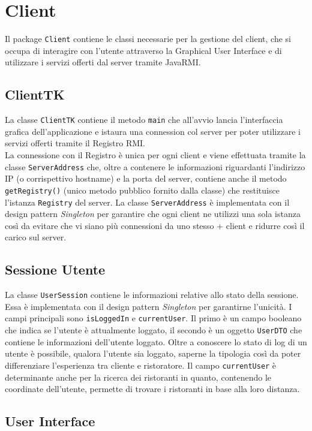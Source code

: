 \section{Client}
Il package \texttt{Client} contiene le classi necessarie per
la gestione del client, che si occupa di interagire con l'utente 
attraverso la Graphical User Interface e di utilizzare i 
servizi offerti dal server tramite JavaRMI.

\subsection{ClientTK}
La classe \texttt{ClientTK} contiene il metodo \texttt{main}
che all'avvio lancia l'interfaccia grafica dell'applicazione e 
istaura una connession col server per poter utilizzare i servizi 
offerti tramite il Registro RMI.\\
La connessione con il Registro è unica per ogni client e 
viene effettuata tramite la classe \texttt{ServerAddress} che, 
oltre a contenere le informazioni riguardanti l'indirizzo IP (o 
corrispettivo hostname) e la porta del server, contiene anche il metodo
\texttt{getRegistry()} (unico metodo pubblico fornito dalla classe) 
che restituisce l'istanza \texttt{Registry} del server.
La classe \texttt{ServerAddress} è implementata con il design pattern 
\textit{Singleton} per garantire che ogni client ne utilizzi una sola 
istanza così da evitare che vi siano più connessioni da uno stesso +
client e ridurre così il carico sul server.

\subsection{Sessione Utente}
La classe \texttt{UserSession} contiene le informazioni relative
allo stato della sessione.
Essa è implementata con il design pattern \textit{Singleton} 
per garantirne l'unicità.
I campi principali sono \texttt{isLoggedIn} e \texttt{currentUser}.
Il primo è un campo booleano che indica se l'utente è 
attualmente loggato, il secondo è un oggetto \texttt{UserDTO} che 
contiene le informazioni dell'utente loggato.
Oltre a conoscere lo stato di log di un utente è possibile, 
qualora l'utente sia loggato, saperne la tipologia così da 
poter differenziare l'esperienza tra cliente e ristoratore.
Il campo \texttt{currentUser} è determinante anche per la ricerca
dei ristoranti in quanto, contenendo le coordinate dell'utente, 
permette di trovare i ristoranti in base alla loro distanza.

\subsection{User Interface}